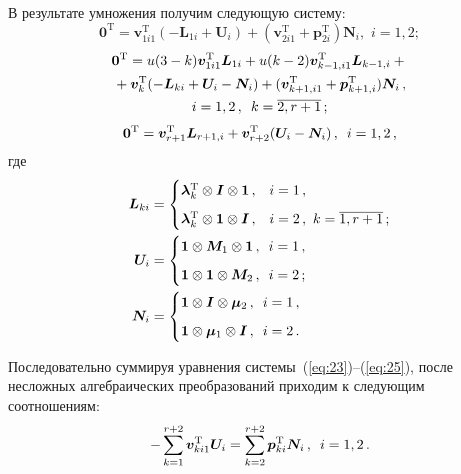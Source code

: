 \begin{multicols}{2}
В результате умножения получим следующую систему:
\begin{equation}
\label{eq:23}
\boldsymbol{0}^{\mathrm{T}}=\boldsymbol{v}_{1i1}^{\mathrm{T}}(-\boldsymbol{L}_{1i}+\boldsymbol{U}_i)+
(\boldsymbol{v}_{2i1}^{\mathrm{T}}+\boldsymbol{p}_{2i}^{\mathrm{T}})\boldsymbol{N}_i,\,\, i=1,2;
\end{equation}
\begin{multline}
\label{eq:24}
\boldsymbol{0}^{\mathrm{T}}=u(3-k)\boldsymbol{v}_{1i1}^{\mathrm{T}}\boldsymbol{L}_{1i}+
u(k-2)\boldsymbol{v}_{k-1,i1}^{\mathrm{T}}\boldsymbol{L}_{k-1,i}+{}\\
{}+\boldsymbol{v}_k^{\mathrm{T}}(-\boldsymbol{L}_{ki}+\boldsymbol{U}_i-\boldsymbol{N}_i)
+(\boldsymbol{v}_{k+1,i1}^{\mathrm{T}}+\boldsymbol{p}_{k+1,i}^{\mathrm{T}})\boldsymbol{N}_i\,,\\
i=1,2\,,\enskip k=\overline{2,r+1}\,;
\end{multline}
\begin{equation}
\label{eq:25}
\boldsymbol{0}^{\mathrm{T}}=\boldsymbol{v}_{r+1}^{\mathrm{T}}\boldsymbol{L}_{r+1,i}+
\boldsymbol{v}_{r+2}^{\mathrm{T}}(\boldsymbol{U}_i-\boldsymbol{N}_i)\,,\enskip i=1,2\,,
\end{equation}
где
\begin{align*}
\boldsymbol{L}_{ki}&=
\begin{cases}
\boldsymbol{\lambda}_k^{\mathrm{T}}\otimes\boldsymbol{I}\otimes\boldsymbol{1}\,, & i=1\,,\\[6pt]
\boldsymbol{\lambda}_k^{\mathrm{T}}\otimes\boldsymbol{1}\otimes\boldsymbol{I}\,, &i=2\,,\,\,
k=\overline{1,r+1}\,;
\end{cases}
\\
\boldsymbol{U}_i&=
\begin{cases}
\boldsymbol{1}\otimes\boldsymbol{M}_1\otimes\boldsymbol{1}\,, \enskip i=1\,,\\[6pt]
\boldsymbol{1}\otimes\boldsymbol{1}\otimes\boldsymbol{M}_2\,,\enskip i=2\,;
\end{cases}
\\
\boldsymbol{N}_i&=
\begin{cases}
\boldsymbol{1}\otimes\boldsymbol{I}\otimes\boldsymbol{\mu}_2\,,\enskip i=1\,,\\[6pt]
\boldsymbol{1}\otimes\boldsymbol{\mu}_1\otimes\boldsymbol{I}\,,\enskip i=2\,.
\end{cases}
\end{align*}

Последовательно суммируя уравнения системы~(\ref{eq:23})--(\ref{eq:25}), 
после несложных алгебраических преобразований приходим к следующим соотношениям:
\begin{equation}
\label{eq:26}
-\sum\limits_{k=1}^{r+2}\boldsymbol{v}_{ki1}^{\mathrm{T}}\boldsymbol{U}_i=
\sum\limits_{k=2}^{r+2}\boldsymbol{p}_{ki}^{\mathrm{T}}\boldsymbol{N}_i\,,\enskip i=1,2\,.
\end{equation}



\end{multicols}
